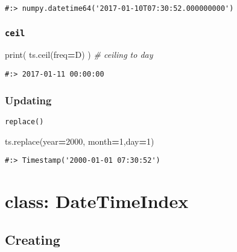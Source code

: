 \documentclass[
]{book}
\newenvironment{Shaded}{\begin{snugshade}}{\end{snugshade}}
\newcommand{\BuiltInTok}[1]{#1}
\newcommand{\CommentTok}[1]{\textcolor[rgb]{0.37,0.37,0.37}{\textit{#1}}}
\newcommand{\DecValTok}[1]{\textcolor[rgb]{0.06,0.06,0.06}{#1}}
\newcommand{\NormalTok}[1]{#1}
\newcommand{\OperatorTok}[1]{\textcolor[rgb]{0.43,0.43,0.43}{\textbf{#1}}}
\newcommand{\StringTok}[1]{\textcolor[rgb]{0.5,0.5,0.5}{#1}}
\begin{document}
\begin{verbatim}
#:> numpy.datetime64('2017-01-10T07:30:52.000000000')
\end{verbatim}

\hypertarget{ceil}{%
\subsubsection{\texorpdfstring{\texttt{ceil}}{ceil}}\label{ceil}}

\begin{Shaded}
\begin{Highlighting}[]
\BuiltInTok{print}\NormalTok{( ts.ceil(freq}\OperatorTok{=}\StringTok{\textquotesingle{}D\textquotesingle{}}\NormalTok{) ) }\CommentTok{\# ceiling to day}
\end{Highlighting}
\end{Shaded}

\begin{verbatim}
#:> 2017-01-11 00:00:00
\end{verbatim}

\hypertarget{updating}{%
\subsubsection{Updating}\label{updating}}

\texttt{replace()}

\begin{Shaded}
\begin{Highlighting}[]
\NormalTok{ts.replace(year}\OperatorTok{=}\DecValTok{2000}\NormalTok{, month}\OperatorTok{=}\DecValTok{1}\NormalTok{,day}\OperatorTok{=}\DecValTok{1}\NormalTok{)}
\end{Highlighting}
\end{Shaded}

\begin{verbatim}
#:> Timestamp('2000-01-01 07:30:52')
\end{verbatim}

\hypertarget{class-datetimeindex}{%
\section{class: DateTimeIndex}\label{class-datetimeindex}}

\hypertarget{creating-1}{%
\subsection{Creating}\label{creating-1}}
\end{document}
